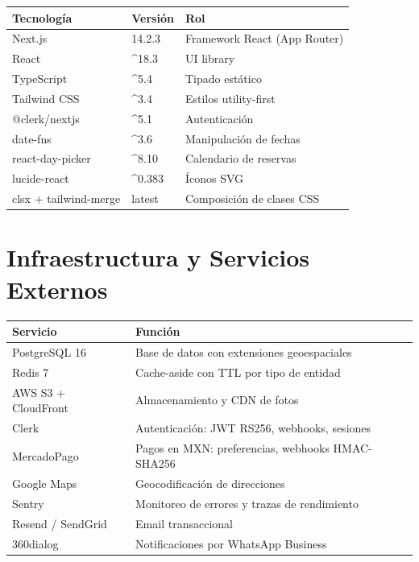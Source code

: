 \documentclass[12pt,a4paper]{report}
\begin{document}
\begin{center}
\begin{tabularx}{\textwidth}{L{4.5cm} L{2.5cm} X}
\toprule
\textbf{Tecnolog\'ia} & \textbf{Versi\'on} & \textbf{Rol} \\
\midrule
Next.js & 14.2.3 & Framework React (App Router) \\
React & \^{}18.3 & UI library \\
TypeScript & \^{}5.4 & Tipado est\'atico \\
Tailwind CSS & \^{}3.4 & Estilos utility-first \\
@clerk/nextjs & \^{}5.1 & Autenticaci\'on \\
date-fns & \^{}3.6 & Manipulaci\'on de fechas \\
react-day-picker & \^{}8.10 & Calendario de reservas \\
lucide-react & \^{}0.383 & \'Iconos SVG \\
clsx + tailwind-merge & latest & Composici\'on de clases CSS \\
\bottomrule
\end{tabularx}
\end{center}

\section{Infraestructura y Servicios Externos}

\begin{center}
\begin{tabularx}{\textwidth}{L{4cm} X}
\toprule
\textbf{Servicio} & \textbf{Funci\'on} \\
\midrule
PostgreSQL 16 & Base de datos con extensiones geoespaciales \\
Redis 7 & Cache-aside con TTL por tipo de entidad \\
AWS S3 + CloudFront & Almacenamiento y CDN de fotos \\
Clerk & Autenticaci\'on: JWT RS256, webhooks, sesiones \\
MercadoPago & Pagos en MXN: preferencias, webhooks HMAC-SHA256 \\
Google Maps & Geocodificaci\'on de direcciones \\
Sentry & Monitoreo de errores y trazas de rendimiento \\
Resend / SendGrid & Email transaccional \\
360dialog & Notificaciones por WhatsApp Business \\
\bottomrule
\end{tabularx}
\end{center}
\end{document}
